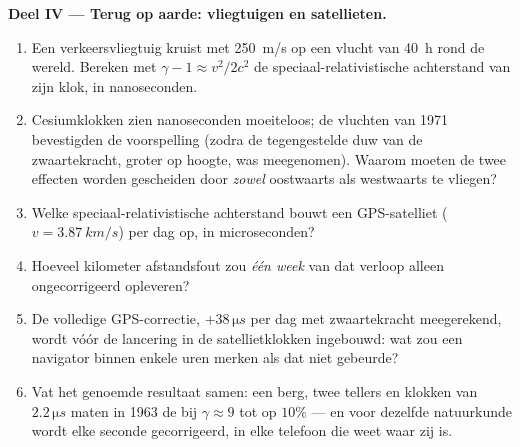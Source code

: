 \begin{problem}
\medskip\noindent\textbf{Deel IV --- Terug op aarde: vliegtuigen en
satellieten.}
\begin{enumerate}[resume]
  \item Een verkeersvliegtuig kruist met \qty{250}{m/s} op een vlucht van
        \qty{40}{h} rond de wereld. Bereken met $\gamma - 1 \approx v^2/2c^2$ de speciaal-relativistische achterstand van zijn klok,
        in nanoseconden.
  \item Cesiumklokken zien nanoseconden moeiteloos; de vluchten van 1971
        bevestigden de voorspelling (zodra de tegengestelde duw van de
        zwaartekracht, groter op hoogte, was meegenomen). Waarom moeten
        de twee effecten worden gescheiden door \emph{zowel} oostwaarts als
        westwaarts te vliegen?
  \item Welke speciaal-relativistische achterstand bouwt een
        GPS-satelliet ($v = \qty{3.87}{km/s}$) per dag op, in
        microseconden?
  \item Hoeveel kilometer afstandsfout zou \emph{één week} van dat
        verloop alleen ongecorrigeerd opleveren?
  \item De volledige GPS-correctie, $+38\,\unit{\micro s}$ per dag met
        zwaartekracht meegerekend, wordt vóór de lancering in de
        satellietklokken ingebouwd: wat zou een navigator binnen enkele
        uren merken als dat niet gebeurde?
  \item Vat het genoemde resultaat samen: een berg, twee tellers en
        klokken van $2.2\,\unit{\micro s}$ maten in 1963 de  bij
        $\gamma \approx 9$ tot op $10\%$ --- en voor dezelfde natuurkunde
        wordt elke seconde gecorrigeerd, in elke telefoon die weet waar
        zij is.
\end{enumerate}
\end{problem}
